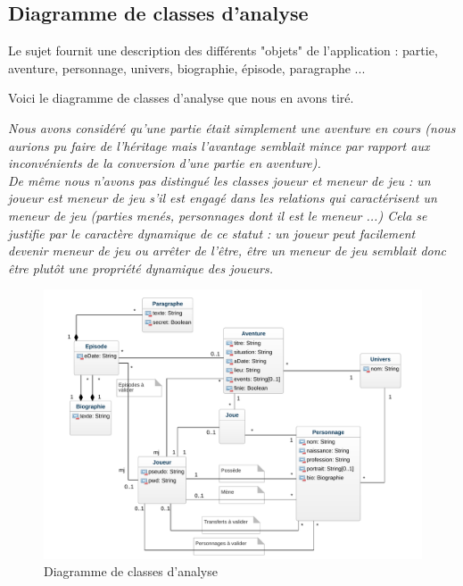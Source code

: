 \documentclass[a4paper, 11pt, titlepage]{article}
\begin{document}
\subsection{Diagramme de classes d'analyse}
Le sujet fournit une description des différents "objets" de l'application : partie, aventure, personnage, univers, biographie, épisode, paragraphe ...

Voici le diagramme de classes d'analyse que nous en avons tiré.

\textit{Nous avons considéré qu'une partie était simplement une aventure en cours (nous aurions pu faire de l'héritage mais l'avantage semblait mince par rapport aux inconvénients de la conversion d'une partie en aventure).\\
De même nous n'avons pas distingué les classes joueur et meneur de jeu : un joueur est meneur de jeu s'il est engagé dans les relations qui caractérisent un meneur de jeu (parties menés, personnages dont il est le meneur ...) Cela se justifie par le caractère dynamique de ce  statut : un joueur peut facilement devenir meneur de jeu ou arrêter de l'être, être un meneur de jeu semblait donc être plutôt une propriété dynamique des joueurs. }

\begin{figure}[ht!]
\includegraphics[scale=0.7]{analyse/classes.pdf}
\caption{Diagramme de classes d'analyse}
\end{figure}
\end{document}

